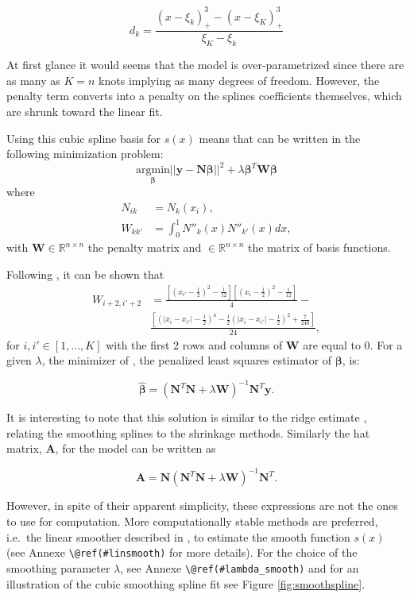 \documentclass[]{book}
\begin{document}
\[d_k = \frac{(x-\xi_k)^3_+ - (x-\xi_K)^3_+}{\xi_K - \xi_k}\]

At first glance it would seems that the model is over-parametrized since
there are as many as \(K = n\) knots implying as many degrees of freedom.
However, the penalty term converts into a penalty on the splines
coefficients themselves, which are shrunk toward the linear fit.

Using this cubic spline basis for \(s(x)\) means that can be written in
the following minimization problem:
\begin{equation}
\underset{\boldsymbol{\beta}}{\text{argmin}} ||\mathbf{y} - \mathbf{N} \boldsymbol{\beta}||^2 + \lambda \boldsymbol{\beta}^T \mathbf{W} \boldsymbol{\beta}
\label{eq:ridgespline}
\end{equation}
where
\[\begin{aligned}
N_{ik} &= N_k(x_i), \\
W_{kk'} &= \int_0^1 N''_k(x) N''_{k'}(x)dx,\end{aligned}\] with
\(\mathbf{W} \in \mathbb{R}^{n \times n}\) the penalty matrix and
\(\mathbf{} \in \mathbb{R}^{n \times n}\) the matrix of basis functions.

Following \citep{gu_smoothing_2002}, it can be shown that \[\begin{aligned}
W_{i+2,i'+2} & = \frac{\left[\left(x_{i'} - \frac{1}{2}\right)^2 - \frac{1}{12}\right]\left[\left(x_{i}  - \frac{1}{2}\right)^2 - \frac{1}{12}\right]}{4} - \\
& \frac{\left[\left(|x_{i} -x_{i'}| - \frac{1}{2}\right)^4 - \frac{1}{2}\left(|x_{i}-x_{i'} | - \frac{1}{2}\right)^2 + \frac{7}{240}\right]}{24},\end{aligned}\]
for \(i,i' \in [1,\dots,K]\) with the first 2 rows and columns of \(\mathbf{W}\)
are equal to \(0\). For a given \(\lambda\), the minimizer of , the
penalized least squares estimator of \(\boldsymbol{\beta}\), is:

\[\hat{\boldsymbol{\beta}} = (\mathbf{N}^T\mathbf{N} + \lambda\mathbf{W})^{-1}\mathbf{N}^T\mathbf{y}.\]

It is interesting to note that this solution is similar to the ridge
estimate , relating the smoothing splines to the shrinkage methods.
Similarly the hat matrix, \(\mathbf{A}\), for the model can be written as

\[\mathbf{A} = \mathbf{N}(\mathbf{N}^T\mathbf{N} + \lambda\mathbf{W})^{-1}\mathbf{N}^T.\]

However, in spite of their apparent simplicity, these expressions are
not the ones to use for computation. More computationally stable methods
are preferred, i.e.~the linear smoother described in
\citep{buja_linear_1989}, to estimate the smooth function \(s(x)\) (see Annexe
\texttt{\textbackslash{}@ref(\#linsmooth)} for more details). For the choice of the smoothing
parameter \(\lambda\), see Annexe \texttt{\textbackslash{}@ref(\#lambda\_smooth)} and for an
illustration of the cubic smoothing spline fit see Figure
\ref{fig:smoothspline}.
\end{document}
